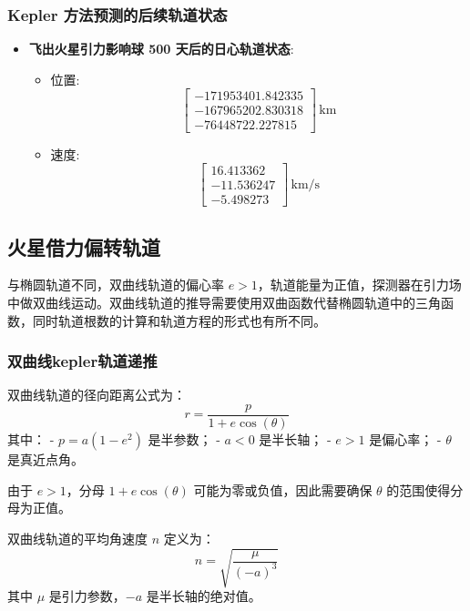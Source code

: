 \documentclass[12pt,a4paper]{article}
\begin{document}
\subsubsection{Kepler 方法预测的后续轨道状态}
\begin{itemize}
    \item \textbf{飞出火星引力影响球 500 天后的日心轨道状态}:
    \begin{itemize}
        \item 位置: 
        \[
        \begin{bmatrix}
            -171953401.842335 \\ -167965202.830318 \\ -76448722.227815
        \end{bmatrix} \, \text{km}
        \]
        \item 速度: 
        \[
        \begin{bmatrix}
            16.413362 \\ -11.536247 \\ -5.498273
        \end{bmatrix} \, \text{km/s}
        \]
    \end{itemize}
\end{itemize}

\subsection{火星借力偏转轨道}
与椭圆轨道不同，双曲线轨道的偏心率 \(e > 1\)，轨道能量为正值，探测器在引力场中做双曲线运动。双曲线轨道的推导需要使用双曲函数代替椭圆轨道中的三角函数，同时轨道根数的计算和轨道方程的形式也有所不同。

\subsubsection{双曲线kepler轨道递推}
双曲线轨道的径向距离公式为：
\begin{equation}
    r = \frac{p}{1 + e \cos(\theta)}
\end{equation}
其中：
- \(p = a(1 - e^2)\) 是半参数；
- \(a < 0\) 是半长轴；
- \(e > 1\) 是偏心率；
- \(\theta\) 是真近点角。

由于 \(e > 1\)，分母 \(1 + e \cos(\theta)\) 可能为零或负值，因此需要确保 \(\theta\) 的范围使得分母为正值。

双曲线轨道的平均角速度 \(n\) 定义为：
\begin{equation}
    n = \sqrt{\frac{\mu}{(-a)^3}}
\end{equation}
其中 \(\mu\) 是引力参数，\(-a\) 是半长轴的绝对值。
\end{document}
